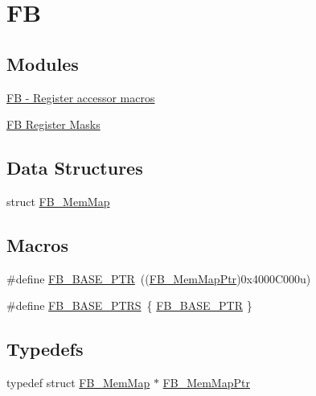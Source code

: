 \hypertarget{group___f_b___peripheral}{}\section{F\+B}
\label{group___f_b___peripheral}
\subsection*{Modules}
\begin{DoxyCompactItemize}
\item 
\hyperlink{group___f_b___register___accessor___macros}{F\+B -\/ Register accessor macros}
\item 
\hyperlink{group___f_b___register___masks}{F\+B Register Masks}
\end{DoxyCompactItemize}
\subsection*{Data Structures}
\begin{DoxyCompactItemize}
\item 
struct \hyperlink{struct_f_b___mem_map}{F\+B\+\_\+\+Mem\+Map}
\end{DoxyCompactItemize}
\subsection*{Macros}
\begin{DoxyCompactItemize}
\item 
\#define \hyperlink{group___f_b___peripheral_gace69013248279ed94480b3d6f6aa9fa6}{F\+B\+\_\+\+B\+A\+S\+E\+\_\+\+P\+T\+R}~((\hyperlink{group___f_b___peripheral_gaebb09d71e958c6590cf946799cb4aa11}{F\+B\+\_\+\+Mem\+Map\+Ptr})0x4000\+C000u)
\item 
\#define \hyperlink{group___f_b___peripheral_ga0aa36a3189de1e68b58234782768941a}{F\+B\+\_\+\+B\+A\+S\+E\+\_\+\+P\+T\+R\+S}~\{ \hyperlink{group___f_b___peripheral_gace69013248279ed94480b3d6f6aa9fa6}{F\+B\+\_\+\+B\+A\+S\+E\+\_\+\+P\+T\+R} \}
\end{DoxyCompactItemize}
\subsection*{Typedefs}
\begin{DoxyCompactItemize}
\item 
typedef struct \hyperlink{struct_f_b___mem_map}{F\+B\+\_\+\+Mem\+Map} $\ast$ \hyperlink{group___f_b___peripheral_gaebb09d71e958c6590cf946799cb4aa11}{F\+B\+\_\+\+Mem\+Map\+Ptr}
\end{DoxyCompactItemize}


